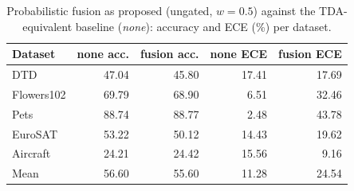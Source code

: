 \begin{table}[htbp]
\centering
\begin{tabular}{lrrrr}
\toprule
Dataset & none acc. & fusion acc. & none ECE & fusion ECE \\
\midrule
DTD & 47.04 & 45.80 & 17.41 & 17.69 \\
Flowers102 & 69.79 & 68.90 & 6.51 & 32.46 \\
Pets & 88.74 & 88.77 & 2.48 & 43.78 \\
EuroSAT & 53.22 & 50.12 & 14.43 & 19.62 \\
Aircraft & 24.21 & 24.42 & 15.56 & 9.16 \\
Mean & 56.60 & 55.60 & 11.28 & 24.54 \\
\bottomrule
\end{tabular}
\caption{Probabilistic fusion as proposed (ungated, $w = 0.5$) against the TDA-equivalent baseline (\emph{none}): accuracy and ECE (\%) per dataset.}
\label{tab:fusion}
\end{table}
